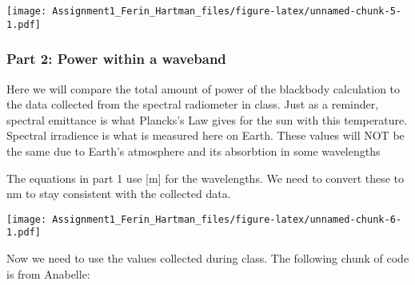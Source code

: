 \documentclass[]{article}
\newenvironment{Shaded}{\begin{snugshade}}{\end{snugshade}}
\newcommand{\KeywordTok}[1]{\textcolor[rgb]{0.13,0.29,0.53}{\textbf{#1}}}
\newcommand{\DataTypeTok}[1]{\textcolor[rgb]{0.13,0.29,0.53}{#1}}
\newcommand{\FloatTok}[1]{\textcolor[rgb]{0.00,0.00,0.81}{#1}}
\newcommand{\StringTok}[1]{\textcolor[rgb]{0.31,0.60,0.02}{#1}}
\newcommand{\OperatorTok}[1]{\textcolor[rgb]{0.81,0.36,0.00}{\textbf{#1}}}
\newcommand{\NormalTok}[1]{#1}
\begin{document}
\texttt{[image: Assignment1\_Ferin\_Hartman\_files/figure-latex/unnamed-chunk-5-1.pdf]}

\subsubsection{Part 2: Power within a
waveband}\label{part-2-power-within-a-waveband}

Here we will compare the total amount of power of the blackbody
calculation to the data collected from the spectral radiometer in class.
Just as a reminder, spectral emittance is what Plancks's Law gives for
the sun with this temperature. Spectral irradience is what is measured
here on Earth. These values will NOT be the same due to Earth's
atmosphere and its absorbtion in some wavelengths

The equations in part 1 use {[}m{]} for the wavelengths. We need to
convert these to nm to stay consistent with the collected data.

\begin{Shaded}
\end{Shaded}

\texttt{[image: Assignment1\_Ferin\_Hartman\_files/figure-latex/unnamed-chunk-6-1.pdf]}

Now we need to use the values collected during class. The following
chunk of code is from Anabelle:
\end{document}
